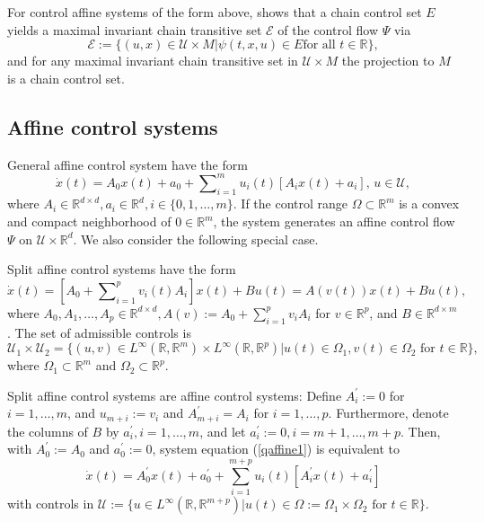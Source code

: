 	For control affine systems of the form above, \cite[Proposition 1.24]{Kawa13}
	shows that a chain control set $E$ yields a maximal invariant chain transitive
	set $\mathcal{E}$ of the control flow $\Psi$ via
	\begin{equation}
		\mathcal{E}:=\{(u,x)\in\mathcal{U}\times M\left\vert \psi(t,x,u)\in E\mbox{
			for all }t\in\mathbb{R}\right.  \}, \label{chain_transitive1}%
	\end{equation}
	and for any maximal invariant chain transitive set in $\mathcal{U}\times M$
	the projection to $M$ is a chain control set.
	
	\subsection{Affine control systems}
	
	General affine control system have the form
	\begin{equation}
		\dot{x}(t)=A_{0}x(t)+a_{0}+\sum\nolimits_{i=1}^{m}u_{i}(t)[A_{i}%
		x(t)+a_{i}],\,u\in\mathcal{U}, \label{control_affine}%
	\end{equation}
	where $A_{i}\in\mathbb{R}^{d\times d},a_{i}\in\mathbb{R}^{d},i\in
	\{0,1,\ldots,m\}$. If the control range $\Omega\subset\mathbb{R}^{m}$ is a
	convex and compact neighborhood of $0\in\mathbb{R}^{m}$, the system generates
	an affine control flow $\Psi$ on $\mathcal{U}\times\mathbb{R}^{d}$. We also
	consider the following special case.
	
	\begin{definition}
		Split affine control systems have the form
		\begin{equation}
			\dot{x}(t)=\left[  A_{0}+\sum\nolimits_{i=1}^{p}v_{i}(t)A_{i}\right]
			x(t)+Bu(t)=A(v(t))x(t)+Bu(t), \label{qaffine1}%
		\end{equation}
		where $A_{0},A_{1},\ldots,A_{p}\in\mathbb{R}^{d\times d},A(v):=A_{0}%
		+\sum\nolimits_{i=1}^{p}v_{i}A_{i}$ for $v\in\mathbb{R}^{p}$, and
		$B\in\mathbb{R}^{d\times m}$. The set of admissible controls is
		\[
		\mathcal{U}_{1}\times\mathcal{U}_{2}=\{(u,v)\in L^{\infty}(\mathbb{R}%
		,\mathbb{R}^{m})\times L^{\infty}(\mathbb{R},\mathbb{R}^{p})\left\vert
		u(t)\in\Omega_{1},v(t)\in\Omega_{2}\text{ for }t\in\mathbb{R}\right.  \},
		\]
		where $\Omega_{1}\subset\mathbb{R}^{m}$ and $\Omega_{2}\subset\mathbb{R}^{p}$.
	\end{definition}
	
	Split affine control systems are affine control systems: Define $A_{i}%
	^{\prime}:=0$ for $i=1,\ldots,m$, and $u_{m+i}:=v_{i}$ and $A_{m+i}^{\prime
	}=A_{i}$ for $i=1,\ldots,p$. Furthermore, denote the columns of $B$ by
	$a_{i}^{\prime},i=1,\ldots,m$, and let $a_{i}^{\prime}:=0,i=m+1,\ldots
	,\allowbreak m+p$. Then, with $A_{0}^{\prime}:=A_{0}$ and $a_{0}^{\prime}:=0$,
	system equation (\ref{qaffine1}) is equivalent to
	\[
	\dot{x}(t)=A_{0}^{\prime}x(t)+a_{0}^{\prime}+\sum_{i=1}^{m+p}u_{i}(t)\left[
	A_{i}^{\prime}x(t)+a_{i}^{\prime}\right]
	\]
	with controls in $\mathcal{U}:=\{u\in L^{\infty}(\mathbb{R},\mathbb{R}%
	^{m+p})\left\vert u(t)\in\Omega:=\Omega_{1}\times\Omega_{2}\text{ for }%
	t\in\mathbb{R}\right.  \}$.
	
